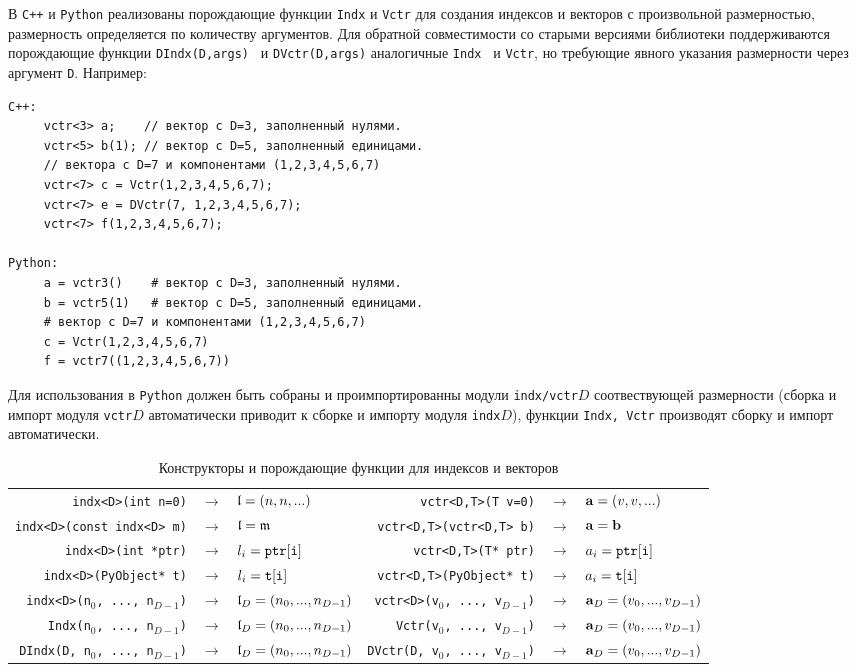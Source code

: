 В {\tt C++} и {\tt Python} реализованы  порождающие
функции {\tt Indx} и {\tt Vctr} для создания индексов и векторов с
произвольной размерностью, размерность определяется по количеству
аргументов. Для обратной совместимости со старыми версиями библиотеки поддерживаются
порождающие 
функции {\tt DIndx(D,args) } и {\tt  DVctr(D,args)}
аналогичные  {\tt Indx } и {\tt Vctr}, но требующие явного указания
размерности через аргумент {\tt D}. Например:
\begin{verbatim}
C++:
     vctr<3> a;    // вектор с D=3, заполненный нулями.
     vctr<5> b(1); // вектор с D=5, заполненный единицами.
     // вектора с D=7 и компонентами (1,2,3,4,5,6,7)
     vctr<7> c = Vctr(1,2,3,4,5,6,7);  
     vctr<7> e = DVctr(7, 1,2,3,4,5,6,7); 
     vctr<7> f(1,2,3,4,5,6,7); 

Python:
     a = vctr3()    # вектор с D=3, заполненный нулями.
     b = vctr5(1)   # вектор с D=5, заполненный единицами.
     # вектор с D=7 и компонентами (1,2,3,4,5,6,7)
     c = Vctr(1,2,3,4,5,6,7) 
     f = vctr7((1,2,3,4,5,6,7)) 
\end{verbatim}
Для использования в {\tt Python} должен быть собраны и проимпортированны
модули {\tt indx/vctr}$D$ соотвествующей размерности (сборка и импорт модуля {\tt vctr}$D$ автоматически приводит к 
сборке и импорту модуля {\tt indx}$D$), 
функции  {\tt Indx, Vctr} производят сборку и импорт автоматически.

\begin{table}
\footnotesize
\begin{tabular}{rclrcl}
{\tt indx<D>(int n=0)} & $\to$ & $\mathfrak{l}=(n,n,...)$ & {\tt vctr<D,T>(T v=0)}& $\to$ & $ \mathbf{a}=(v,v,...)$ \\
{\tt indx<D>(const indx<D> m)} & $\to$ & $\mathfrak{l}=\mathfrak{m}$ & {\tt vctr<D,T>(vctr<D,T> b)}& $\to$ & $ \mathbf{a}=\mathbf{b}$ \\
{\tt indx<D>(int *ptr)} & $\to$ & $l_i={\tt ptr[i]}$ & {\tt vctr<D,T>(T* ptr)} & $\to$ & $ a_i={\tt ptr[i]}$ \\
{\tt indx<D>(PyObject* t)} & $\to$ & $l_i={\tt t[i]}$ & {\tt vctr<D,T>(PyObject* t)} & $\to$ & $ a_i={\tt t[i]}$ \\
{\tt indx<D>(n$_0$, ..., n$_{D-1}$)} & $\to$ & $\mathfrak{l}_D=(n_0, ..., n_{D-1})$ & 
{\tt vctr<D>(v$_0$, ..., v$_{D-1}$)} & $\to$ & $ \mathbf{a}_D=(v_0, ..., v_{D-1})$ \\
{\tt Indx(n$_0$, ..., n$_{D-1}$)} & $\to$ & $\mathfrak{l}_D=(n_0, ..., n_{D-1})$ & 
{\tt Vctr(v$_0$, ..., v$_{D-1}$)} & $\to$ & $ \mathbf{a}_D=(v_0, ..., v_{D-1})$ \\
{\tt DIndx(D, n$_0$, ..., n$_{D-1}$)} & $\to$ & $ \mathfrak{l}_D=(n_0, ...,n_{D-1})$ & 
{\tt DVctr(D, v$_0$, ..., v$_{D-1}$)} & $\to$ & $ \mathbf{a}_D=(v_0, ..., v_{D-1})$ \\
\end{tabular}
\caption{Конструкторы и порождающие функции для индексов и векторов}\label{vctr:construct:table}
\end{table}

